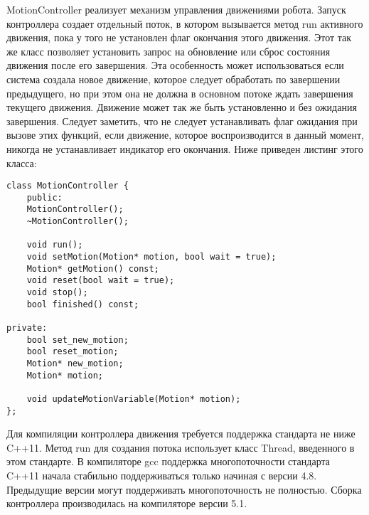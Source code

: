 MotionController реализует механизм управления движениями робота. Запуск контроллера создает отдельный поток, в котором вызывается метод run активного движения, пока у того не установлен флаг окончания этого движения. Этот  так же класс позволяет установить запрос на обновление или сброс состояния движения после его завершения. Эта особенность может использоваться если система создала новое движение, которое следует обработать по завершении предыдущего, но при этом она не должна в основном потоке ждать завершения текущего движения. Движение может так же быть установленно и без ожидания завершения. Следует заметить, что не следует устанавливать флаг ожидания при вызове этих функций, если движение, которое воспроизводится в данный момент, никогда не устанавливает индикатор его окончания. Ниже приведен листинг этого класса:

\lstset{language=C++}
\begin{lstlisting}
class MotionController {
    public:
    MotionController();
    ~MotionController();
        
    void run();
    void setMotion(Motion* motion, bool wait = true);
    Motion* getMotion() const;    
    void reset(bool wait = true);
    void stop();
    bool finished() const;
        
private:
    bool set_new_motion;
    bool reset_motion;
    Motion* new_motion;
    Motion* motion;

    void updateMotionVariable(Motion* motion);
};
\end{lstlisting}

Для компиляции контроллера движения требуется поддержка стандарта не ниже C++11. Метод run для создания потока использует класс Thread, введенного в этом стандарте. В компиляторе gcc поддержка многопоточности стандарта C++11 начала стабильно поддерживаться только начиная с версии 4.8. Предыдущие версии могут поддерживать многопоточность не полностью. Сборка контроллера производилась на компиляторе версии 5.1.